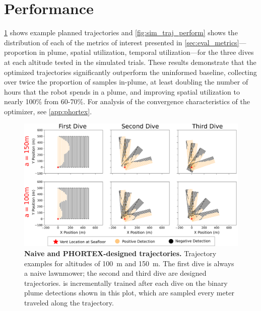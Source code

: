 \section{\PHORTEX Performance}
\label{sec:phortex_perform}
\cref{fig:sim_traj_example} shows example planned trajectories and \cref{fig:sim_traj_perform} shows the distribution of each of the metrics of interest presented in \cref{sec:eval_metrics}---proportion in plume, spatial utilization, temporal utilization---for the three dives at each altitude tested in the simulated trials. These results demonstrate that the \PHORTEX optimized trajectories significantly outperform the uninformed baseline, collecting over twice the proportion of samples in-plume, at least doubling the number of hours that the robot spends in a plume, and improving spatial utilization to nearly 100\% from 60-70\%. For analysis of the convergence characteristics of the optimizer, see \cref{app:phortex}. 

\begin{figure}[h!]
    \centering
    \includegraphics[width=0.85\columnwidth]{figures/sim_traj.png}
    \caption[Naive and \PHORTEX-design trajectories]{\textbf{Naive and PHORTEX-designed trajectories.} Trajectory examples for altitudes of \SI{100}{\meter} and \SI{150}{\meter}. The first dive is always a naive lawnmower; the second and third dive are \PHORTEX designed trajectories. \PHUMES is incrementally trained after each dive on the binary plume detections shown in this plot, which are sampled every meter traveled along the trajectory.}
    \label{fig:sim_traj_example}
\end{figure}


